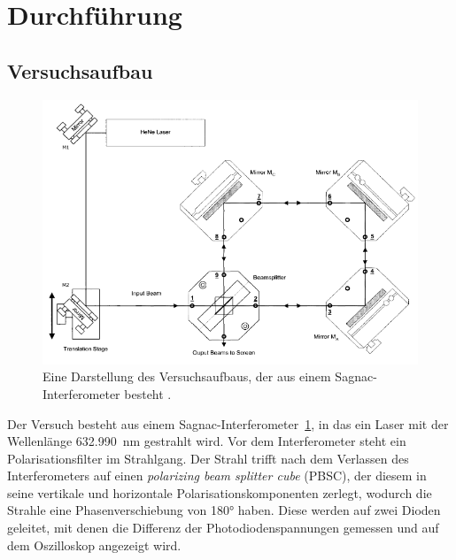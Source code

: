\section{Durchführung}
\label{sec:Durchführung}
\subsection{Versuchsaufbau}
\begin{figure}[h]
    \centering
    \includegraphics[width = \textwidth]{bild/Aufbau.png}
    \caption{Eine Darstellung des Versuchsaufbaus, der aus einem Sagnac-Interferometer besteht \cite{V64}.}
    \label{fig:Aufbau}
\end{figure}

\noindent
Der Versuch besteht aus einem Sagnac-Interferometer~\ref{fig:Aufbau},
in das ein Laser mit der Wellenlänge \SI{632.990}{\nano\metre} gestrahlt wird. 
Vor dem Interferometer steht ein Polarisationsfilter im Strahlgang.
Der Strahl trifft nach dem Verlassen des Interferometers auf einen 
\textit{polarizing beam splitter cube} (PBSC), 
der diesem in seine vertikale und horizontale Polarisationskomponenten zerlegt,
wodurch die Strahle eine Phasenverschiebung von 180° haben.
Diese werden auf zwei Dioden geleitet,
mit denen die Differenz der Photodiodenspannungen gemessen 
und auf dem Oszilloskop angezeigt wird.

